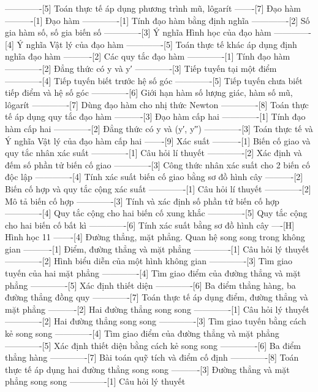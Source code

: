 -------------[5] Toán thực tế áp dụng phương trình mũ, lôgarít
-------[7] Đạo hàm
----------[1] Đạo hàm
-------------[1] Tính đạo hàm bằng định nghĩa
-------------[2] Số gia hàm số, số gia biến số
-------------[3] Ý nghĩa Hình học của đạo hàm
-------------[4] Ý nghĩa Vật lý của đạo hàm
-------------[5] Toán thực tế khác áp dụng định nghĩa đạo hàm
----------[2] Các quy tắc đạo hàm
-------------[1] Tính đạo hàm
-------------[2] Đẳng thức có y và y′
-------------[3] Tiếp tuyến tại một điểm
-------------[4] Tiếp tuyến biết trước hệ số góc
-------------[5] Tiếp tuyến chưa biết tiếp điểm và hệ số góc
-------------[6] Giới hạn hàm số lượng giác, hàm số mũ, lôgarít
-------------[7] Dùng đạo hàm cho nhị thức Newton
-------------[8] Toán thực tế áp dụng quy tắc đạo hàm
----------[3] Đạo hàm cấp hai
-------------[1] Tính đạo hàm cấp hai
-------------[2] Đẳng thức có y và (y′, y′′)
-------------[3] Toán thực tế và Ý nghĩa Vật lý của đạo hàm cấp hai
-------[9] Xác suất
----------[1] Biến cố giao và quy tắc nhân xác suất
-------------[1] Câu hỏi lí thuyết
-------------[2] Xác định và đếm số phần tử biến cố giao
-------------[3] Công thức nhân xác suất cho 2 biến cố độc lập
-------------[4] Tính xác suất biến cố giao bằng sơ đồ hình cây
----------[2] Biến cố hợp và quy tắc cộng xác suất
-------------[1] Câu hỏi lí thuyết
-------------[2] Mô tả biến cố hợp
-------------[3] Tính và xác định số phần tử biến cố hợp
-------------[4] Quy tắc cộng cho hai biến cố xung khắc
-------------[5] Quy tắc cộng cho hai biến cố bất kì
-------------[6] Tính xác suất bằng sơ đồ hình cây
----[H] Hình học 11
-------[4] Đường thẳng, mặt phẳng. Quan hệ song song trong không gian
----------[1] Điểm, đường thẳng và mặt phẳng
-------------[1] Câu hỏi lý thuyết
-------------[2] Hình biểu diễn của một hình không gian
-------------[3] Tìm giao tuyến của hai mặt phẳng
-------------[4] Tìm giao điểm của đường thẳng và mặt phẳng
-------------[5] Xác định thiết diện
-------------[6] Ba điểm thẳng hàng, ba đường thẳng đồng quy
-------------[7] Toán thực tế áp dụng điểm, đường thẳng và mặt phẳng
----------[2] Hai đường thẳng song song
-------------[1] Câu hỏi lý thuyết
-------------[2] Hai đường thẳng song song
-------------[3] Tìm giao tuyến bằng cách kẻ song song
-------------[4] Tìm giao điểm của đường thẳng và mặt phẳng
-------------[5] Xác định thiết diện bằng cách kẻ song song
-------------[6] Ba điểm thẳng hàng
-------------[7] Bài toán quỹ tích và điểm cố định
-------------[8] Toán thực tế áp dụng hai đường thẳng song song
----------[3] Đường thẳng và mặt phẳng song song
-------------[1] Câu hỏi lý thuyết
